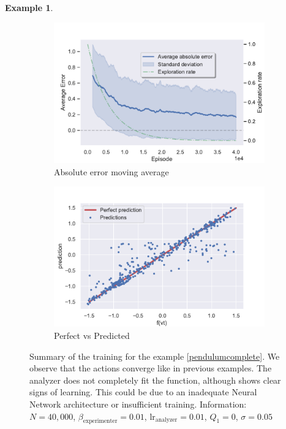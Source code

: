\documentclass[11pt,a4paper,twoside]{report}
\newcommand{\+}{\textnormal{+} }
\theoremstyle{definition}
\newtheorem{myex}[mythm]{Example}
\numberwithin{equation}{chapter}
\begin{document}
\begin{myex}
\begin{figure}
      \bigskip  %
      \begin{subfigure}{0.45\textwidth}
      \includegraphics[width=\linewidth]{figures/Error-MAB5.pdf}
      \caption{Absolute error moving average}
      \end{subfigure}
      \hfill %
      \begin{subfigure}{0.45\textwidth}
      \includegraphics[width=\linewidth]{figures/predictions5.pdf}
      \caption{Perfect vs Predicted}
      \end{subfigure}
      \caption{Summary of the training for the example 
      \ref{pendulumcomplete}. We observe that the actions 
      converge like in previous examples. The analyzer does not 
      completely fit the function, although shows clear signs of 
      learning. This could be due to an inadequate Neural Network
      architecture or insufficient training. Information: $N=40,000$,
      $\beta_\text{experimenter}=0.01$, $\text{lr}_\text{analyzer}=0.01$,
      $Q_1=0$, $\sigma=0.05$}
      \label{fig:completepd}
    \end{figure}
  \end{myex}
\end{document}
